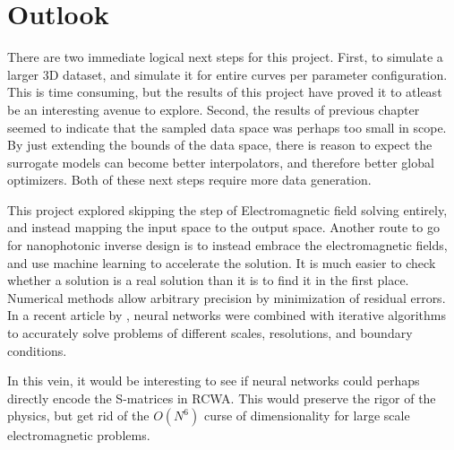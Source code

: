 \chapter{Outlook}
\label{sec:outlook}
There are two immediate logical next steps for this project. First, to simulate a larger 3D dataset, and simulate it for entire curves per parameter configuration.
This is time consuming, but the results of this project have proved it to atleast be an interesting avenue to explore.
Second, the results of previous chapter seemed to indicate that the sampled data space was perhaps too small in scope. By just extending the bounds of the data space, there is reason to expect the surrogate models can become
better interpolators, and therefore better global optimizers. Both of these next steps require more data generation.

This project explored skipping the step of Electromagnetic field solving entirely, and instead mapping the input space to the output space. Another route to go for nanophotonic inverse design is to instead embrace the electromagnetic fields,
and use machine learning to accelerate the solution. It is much easier to check whether a solution is a real solution than it is to find it in the first place. Numerical methods allow arbitrary precision by minimization of residual errors. In a recent article by \cite{jonAfan},
neural networks were combined with iterative algorithms to accurately solve problems of different scales, resolutions, and boundary conditions.

In this vein, it would be interesting to see if neural networks could perhaps directly encode the S-matrices in RCWA. This would preserve the rigor of the physics, but get rid of the $O(N^6)$ curse of dimensionality for large scale electromagnetic problems.